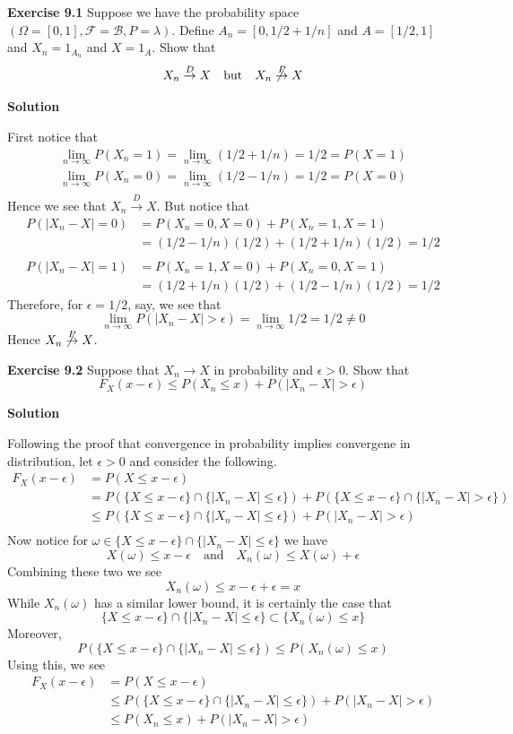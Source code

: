 \documentclass[12pt]{article}  %
\newcommand{\e}{{\epsilon}}
\begin{document}
\textbf{Exercise 9.1} Suppose we have the probability space $(\Omega = [0,1], \mathcal{F} =\mathcal{B}, P = \lambda)$. Define $A_n = [0,1/2 + 1/n]$ and $A = [1/2,1]$ and $X_n = 1_{A_n}$ and $X = 1_{A}$. Show that $$X_n\overset{D}{\to}X\hspace{1em}\text{but}\hspace{1em}X_n\not\overset{P}{\to}X$$ 

\textbf{Solution}

First notice that 
\begin{align*}
\lim_{n\to\infty} P(X_n = 1) = \lim_{n\to\infty} (1/2 + 1/n) = 1/2 = P(X = 1)\\
\lim_{n\to\infty} P(X_n = 0) = \lim_{n\to\infty} (1/2 - 1/n) = 1/2 = P(X = 0)\\ 
\end{align*}
Hence we see that $X_n \overset{D}{\to}X$. But notice that 
\begin{align*}
P(|X_n-X| = 0) &= P(X_n = 0, X = 0) + P(X_n = 1, X = 1)\\
&= (1/2 - 1/n)(1/2) + (1/2 + 1/n)(1/2) = 1/2\\
&\\
P(|X_n-X| = 1) &= P(X_n = 1, X = 0) + P(X_n = 0, X = 1)\\
&= (1/2 + 1/n)(1/2) + (1/2 -1/n)(1/2) = 1/2
\end{align*}
Therefore, for $\e = 1/2$, say, we see that $$\lim_{n\to\infty}P(|X_n - X|>\e) =\lim_{n\to\infty} 1/2= 1/2\neq 0$$
Hence $X_n\not\overset{P}{\to}X$. 

\newpage
\textbf{Exercise 9.2} Suppose that $X_n \to X$ in probability and $\e>0$. Show that $$F_X(x-\e)\leq P(X_n\leq x) + P(|X_n -X|>\e)$$

\textbf{Solution} 

Following the proof that convergence in probability implies convergene in distribution, let $\e>0$ and consider the following. 
\begin{align*}
F_X(x-\e) & = P(X\leq x -\e)\\
&= P(\{X\leq x-\e\}\cap\{|X_n - X|\leq\e\}) + P(\{X\leq x-\e\}\cap\{|X_n - X|>\e\})\\
&\leq P(\{X\leq x-\e\}\cap\{|X_n - X|\leq\e\})  + P(|X_n - X|> \e)\\
\end{align*}
Now notice for $\omega \in \{X\leq x-\e\}\cap\{|X_n - X|\leq\e\}$ we have $$X(\omega)\leq x -\e\hspace{1em}\text{and}\hspace{1em} X_n(\omega) \leq  X(\omega) + \e$$ Combining these two we see $$X_n(\omega)\leq x - \e + \e = x$$ While $X_n(\omega)$ has a similar lower bound, it is certainly the case that $$\{X\leq x-\e\}\cap\{|X_n - X|\leq\e\}\subset \{X_n(\omega)\leq x\}$$ Moreover, 
$$P(\{X\leq x-\e\}\cap\{|X_n - X|\leq\e\})\leq P(X_n(\omega)\leq x)$$ Using this, we see 
\begin{align*}
F_X(x-\e) & = P(X\leq x -\e)\\
&\leq P(\{X\leq x-\e\}\cap\{|X_n - X|\leq\e\})  + P(|X_n - X|>\e)\\
&\leq P(X_n\leq x) + P(|X_n - X|>\e)
\end{align*}
\newpage 
\end{document}

